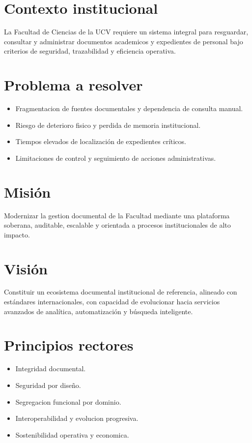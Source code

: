 \section{Contexto institucional}
La Facultad de Ciencias de la UCV requiere un sistema integral para resguardar, consultar y administrar documentos academicos y expedientes de personal bajo criterios de seguridad, trazabilidad y eficiencia operativa.

\section{Problema a resolver}
\begin{itemize}
  \item Fragmentacion de fuentes documentales y dependencia de consulta manual.
  \item Riesgo de deterioro fisico y perdida de memoria institucional.
  \item Tiempos elevados de localización de expedientes críticos.
  \item Limitaciones de control y seguimiento de acciones administrativas.
\end{itemize}

\section{Misión}
Modernizar la gestion documental de la Facultad mediante una plataforma soberana, auditable, escalable y orientada a procesos institucionales de alto impacto.

\section{Visión}
Constituir un ecosistema documental institucional de referencia, alineado con estándares internacionales, con capacidad de evolucionar hacia servicios avanzados de analítica, automatización y búsqueda inteligente.

\section{Principios rectores}
\begin{itemize}
  \item Integridad documental.
  \item Seguridad por diseño.
  \item Segregacion funcional por dominio.
  \item Interoperabilidad y evolucion progresiva.
  \item Sostenibilidad operativa y economica.
\end{itemize}
